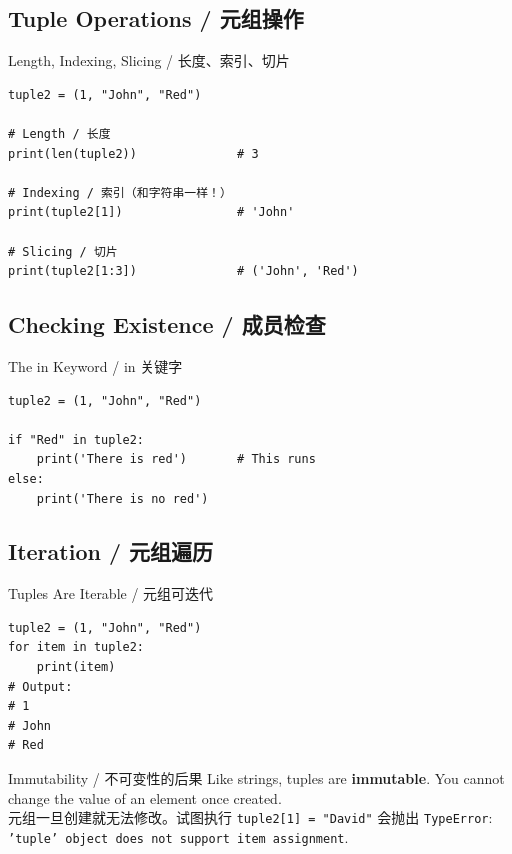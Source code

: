 \documentclass[11pt,a4paper]{article}
\begin{document}
\subsection{Tuple Operations / 元组操作}

\begin{examplebox}{Length, Indexing, Slicing / 长度、索引、切片}
\begin{lstlisting}
tuple2 = (1, "John", "Red")

# Length / 长度
print(len(tuple2))              # 3

# Indexing / 索引（和字符串一样！）
print(tuple2[1])                # 'John'

# Slicing / 切片
print(tuple2[1:3])              # ('John', 'Red')
\end{lstlisting}
\end{examplebox}

\subsection{Checking Existence / 成员检查}

\begin{examplebox}{The in Keyword / in 关键字}
\begin{lstlisting}
tuple2 = (1, "John", "Red")

if "Red" in tuple2:
    print('There is red')       # This runs
else:
    print('There is no red')
\end{lstlisting}
\end{examplebox}

\subsection{Iteration / 元组遍历}

\begin{examplebox}{Tuples Are Iterable / 元组可迭代}
\begin{lstlisting}
tuple2 = (1, "John", "Red")
for item in tuple2:
    print(item)
# Output:
# 1
# John
# Red
\end{lstlisting}
\end{examplebox}

\begin{warning}{Immutability / 不可变性的后果}
    Like strings, tuples are \textbf{immutable}. You cannot change the value of an element once created. \\
    元组一旦创建就无法修改。试图执行 \texttt{tuple2[1] = "David"} 会抛出 \texttt{TypeError}: \texttt{'tuple' object does not support item assignment}.
\end{warning}
\end{document}
